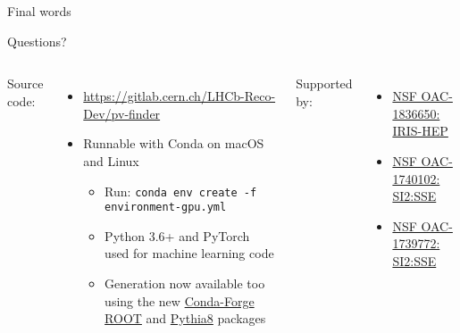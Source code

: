 \begin{frame}{Final words}

\vspace{.5cm}
\begin{center}
    \textcolor{lhcbBlue}{ \huge Questions?}
\end{center}

\vspace{1cm}
\begin{columns}[t]
    Source code:
    \begin{itemize}
        \item \url{https://gitlab.cern.ch/LHCb-Reco-Dev/pv-finder}
        \item Runnable with Conda on macOS and Linux
        \begin{itemize}
            \item Run: \texttt{conda env create -f environment-gpu.yml}
            \item Python 3.6+ and PyTorch used for machine learning code
            \item Generation now available too using the new \href{https://github.com/conda-forge/root-feedstock}{Conda-Forge ROOT} and \href{https://github.com/conda-forge/pythia8-feedstock}{Pythia8} packages
        \end{itemize}
    \end{itemize}

	Supported by:
	\begin{itemize}
		\item \href{https://www.nsf.gov/awardsearch/showAward?AWD_ID=1836650}{NSF OAC-1836650: IRIS-HEP}
		\item \href{https://www.nsf.gov/awardsearch/showAward?AWD_ID=1740102}{NSF OAC-1740102: SI2:SSE}
		\item \href{https://www.nsf.gov/awardsearch/showAward?AWD_ID=1739772}{NSF OAC-1739772: SI2:SSE}
	\end{itemize}
\end{columns}


\end{frame}
